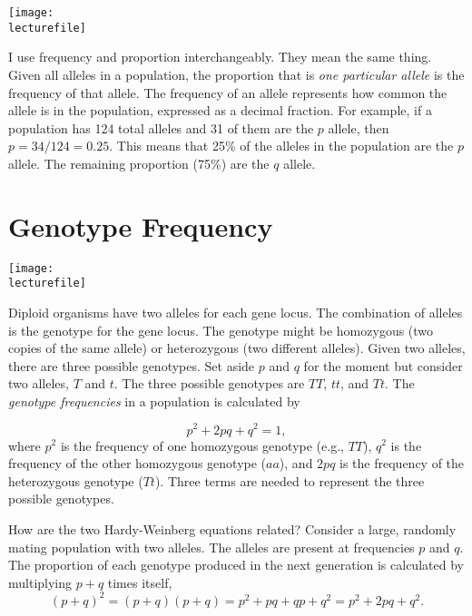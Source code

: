 \documentclass[letterpaper]{tufte-handout}
\newcommand\lecturefile{163_lecture02_fullsize}
\begin{document}
\begin{marginfigure}[0.5in]
	\texttt{[image: \\lecturefile]}
\end{marginfigure}

I use frequency and proportion interchangeably. They mean the same thing.  Given all alleles in a population, the proportion that is \emph{one particular allele} is the frequency of that allele.  The frequency of an allele represents how common the allele is in the population, expressed as a decimal fraction. For example, if a population has 124 total alleles and 31 of them are the $p$ allele, then $p= 34/124 = 0.25$.  This means that 25\% of the alleles in the population are the $p$ allele.  The remaining proportion (75\%) are the $q$ allele.

\section{Genotype Frequency}

\begin{marginfigure}[0.35in]
	\texttt{[image: \\lecturefile]}
\end{marginfigure}

Diploid organisms have two alleles for each gene locus. The combination of alleles is the genotype for the gene locus. The genotype might be homozygous (two copies of the same allele) or heterozygous (two different alleles).  Given two alleles, there are three possible genotypes. Set aside $p$ and $q$ for the moment but consider two alleles, $T$ and $t$. The three possible genotypes are $TT$, $tt$, and $Tt$.  The \emph{genotype frequencies} in a population is calculated by

\begin{equation*}
p^2 + 2pq+q^2=1,
\end{equation*}
where $p^2$ is the frequency of one homozygous genotype (e.g., $TT$), $q^2$ is the frequency of the other homozygous genotype ($aa$), and $2pq$ is the frequency of the heterozygous genotype ($Tt$).  Three terms are needed to represent the three possible genotypes. 

How are the two Hardy-Weinberg equations related?  Consider a large, randomly mating population with two alleles.  The alleles are present at frequencies $p$ and $q$.  The proportion of each genotype produced in the next generation is calculated by multiplying $p+q$ times itself,
\begin{equation*}
(p+q)^2=
(p+q)(p+q) =
p^2 + pq + qp + q^2 =
p^2 + 2pq + q^2.
\end{equation*}
\end{document}
